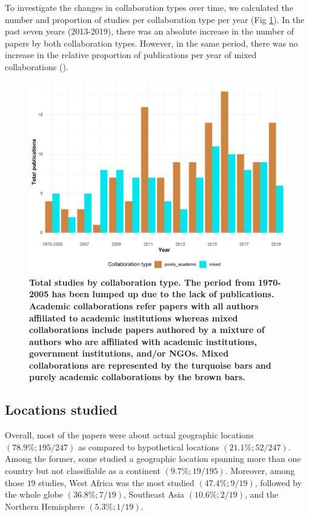 \documentclass[10pt,letterpaper]{article}
\begin{document}
To investigate the changes in collaboration types over time, we calculated the number and proportion of studies per collaboration type per year (Fig \ref{studies_per_collab_type}). In the past seven years (2013-2019), there was an absolute increase in the number of papers by both collaboration types. However, in the same period, there was no increase in the relative proportion of publications per year of mixed collaborations ().

\begin{figure}[!h]
\includegraphics[scale=0.65]{figs/fig3_total_collabs_per_year_plot.png}
	\caption{\bf Total studies by collaboration type. The period from 1970-2005 has been lumped up due to the lack of publications. Academic collaborations refer papers with all authors affiliated to academic institutions whereas mixed collaborations include papers authored by a mixture of authors who are affiliated with academic institutions, government institutions, and/or NGOs. Mixed collaborations are represented by the turquoise bars and purely academic collaborations by the brown bars.}
	\label{studies_per_collab_type}
\end{figure}

\subsection*{Locations studied}
Overall, most of the papers were about actual geographic locations $(78.9\%; 195/247)$ as compared to hypothetical locations $(21.1\%; 52/247)$. Among the former, some studied a geographic location spanning more than one country but not classifiable as a continent $(9.7\%; 19/195)$. Moreover, among those $19$ studies, West Africa was the most studied $(47.4\%; 9/19)$, followed by the whole globe $(36.8\%; 7/19)$, Southeast Asia $(10.6\%; 2/19)$, and the Northern Hemisphere $(5.3\%; 1/19)$. 
\end{document}
